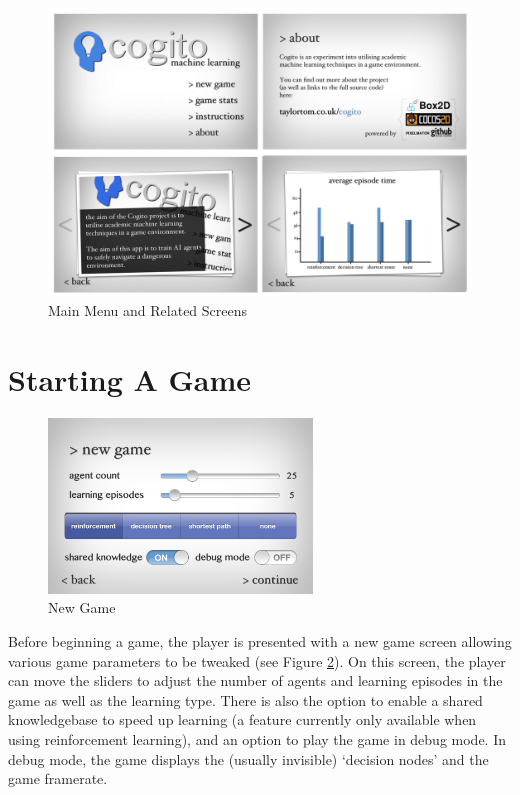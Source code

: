 \documentclass[a4paper,oneside]{report}
\begin{document}
\begin{figure}[h!]
  \centering
    \includegraphics[width=120mm]{sources/images/FinalScreens}
    \caption{Main Menu and Related Screens}
    \label{fig:FinalScreens}
\end{figure}

\section{Starting A Game}

\begin{figure}
  \centering
    \includegraphics[width=70mm]{sources/images/Screen_NewGame}
    \caption{New Game}
    \label{fig:NewGame}
\end{figure}

Before beginning a game, the player is presented with a new game screen allowing various game parameters to be tweaked (see Figure \ref{fig:NewGame}). On this screen, the player can move the sliders to adjust the number of agents and learning episodes in the game as well as the learning type. There is also the option to enable a shared knowledgebase to speed up learning (a feature currently only available when using reinforcement learning), and an option to play the game in debug mode. In debug mode, the game displays the (usually invisible) `decision nodes' and the game framerate.
\end{document}
